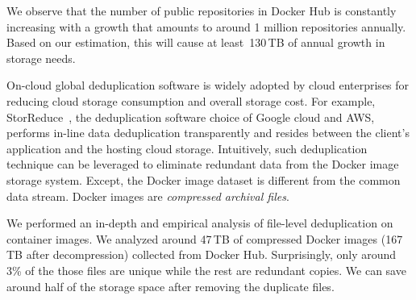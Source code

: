 We observe that the number of public repositories in Docker Hub is constantly increasing with a growth that amounts 
to around 1 million repositories annually. Based on our estimation, this will cause at least~130\,TB of annual growth in storage needs.

On-cloud global deduplication software is widely adopted by cloud enterprises for reducing cloud storage consumption and overall storage cost. 
For example, StorReduce~\cite{storReduce}, the deduplication software choice of Google cloud and AWS, 
performs in-line data deduplication transparently and resides between the client's application and the hosting cloud storage.
Intuitively, such deduplication technique can be leveraged to eliminate redundant data from the Docker image storage system.  
Except, the Docker image dataset is different from the common data stream. 
Docker images are \emph{compressed archival files}.

We performed an in-depth and empirical analysis of file-level deduplication on container images. 
We analyzed around 47\,TB of compressed Docker images (167\,TB after decompression) collected from Docker Hub. 
Surprisingly, only around 3\% of the those files are unique while the rest are redundant copies. 
We can save around half of the storage space after removing the duplicate files.

